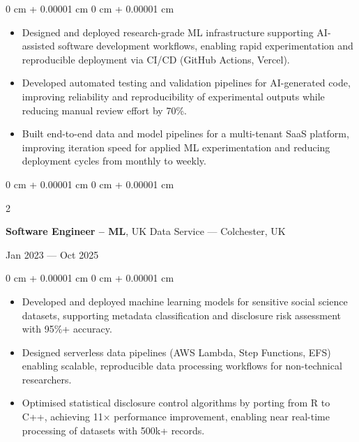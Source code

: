 \documentclass[6pt, letterpaper]{article}
\newenvironment{highlights}{
    \begin{itemize}[
        topsep=0.03 cm,
        parsep=0.03 cm,
        partopsep=0pt,
        itemsep=0pt,
        leftmargin=0 cm + 10pt
    ]
}{
    \end{itemize}
} %
\newenvironment{onecolentry}{
    \begin{adjustwidth}{
        0 cm + 0.00001 cm
    }{
        0 cm + 0.00001 cm
    }
}{
    \end{adjustwidth}
} %
\newenvironment{twocolentry}[2][]{
    \onecolentry
    \def\secondColumn{#2}
    \setcolumnwidth{\fill, 4.5 cm}
    \begin{paracol}{2}
}{
    \switchcolumn \raggedleft \secondColumn
    \end{paracol}
    \endonecolentry
} %
\begin{document}
        \begin{onecolentry}
        \begin{highlights}

            \item Designed and deployed research-grade ML infrastructure supporting AI-assisted software development workflows, enabling rapid experimentation and reproducible deployment via CI/CD (GitHub Actions, Vercel).
            \item Developed automated testing and validation pipelines for AI-generated code, improving reliability and reproducibility of experimental outputs while reducing manual review effort by 70\%.
            \item Built end-to-end data and model pipelines for a multi-tenant SaaS platform, improving iteration speed for applied ML experimentation and reducing deployment cycles from monthly to weekly.

        \end{highlights}
        \end{onecolentry}

        \begin{twocolentry}{Jan 2023 --- Oct 2025}
        \textbf{Software Engineer – ML}, UK Data Service --- Colchester, UK
        \end{twocolentry}

        \begin{onecolentry}
        \begin{highlights}

            \item Developed and deployed machine learning models for sensitive social science datasets, supporting metadata classification and disclosure risk assessment with 95\%+ accuracy.
            \item Designed serverless data pipelines (AWS Lambda, Step Functions, EFS) enabling scalable, reproducible data processing workflows for non-technical researchers.
            \item Optimised statistical disclosure control algorithms by porting from R to C++, achieving 11× performance improvement, enabling near real-time processing of datasets with 500k+ records.

        \end{highlights}
        \end{onecolentry}
\end{document}
